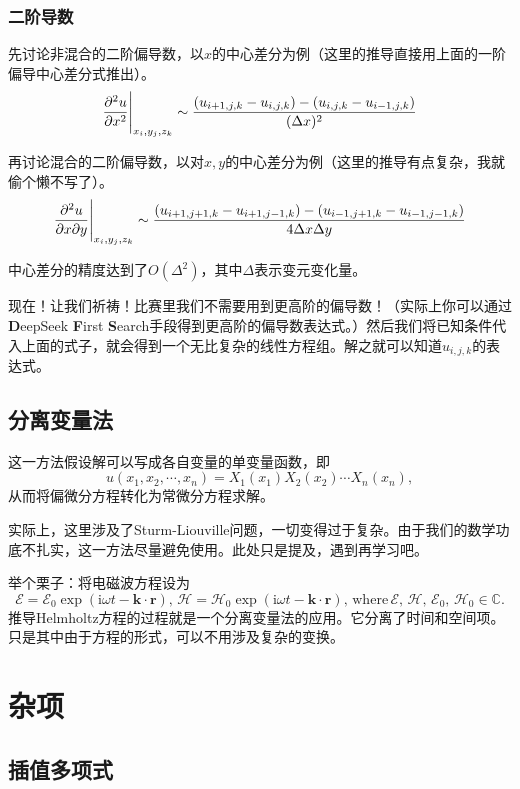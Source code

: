 \documentclass[a4paper, 12pt]{article}
\begin{document}
    \subsubsection{二阶导数}

    先讨论非混合的二阶偏导数，以$x$的中心差分为例（这里的推导直接用上面的一阶偏导中心差分式推出）。
    \[
    \frac{\partial^2 u}{\partial x^2}\Bigg{|}_{x_i,y_j,z_k}\sim\frac{(u_{i+1,j,k}-u_{i,j,k})-(u_{i,j,k}-u_{i-1,j,k})}{(\Delta x)^2}
    \]

    再讨论混合的二阶偏导数，以对$x,y$的中心差分为例（这里的推导有点复杂，我就偷个懒不写了）。
    \[
    \frac{\partial^2 u}{\partial x\partial y}\Bigg{|}_{x_i,y_j,z_k}\sim\frac{(u_{i+1,j+1,k}-u_{i+1,j-1,k})-(u_{i-1,j+1,k}-u_{i-1,j-1,k})}{4\Delta x\Delta y}
    \]

    中心差分的精度达到了$O(\Delta^2)$，其中$\Delta$表示变元变化量。

    现在！让我们祈祷！比赛里我们不需要用到更高阶的偏导数！（实际上你可以通过\textbf DeepSeek \textbf First \textbf Search手段得到更高阶的偏导数表达式。）然后我们将已知条件代入上面的式子，就会得到一个无比复杂的线性方程组。解之就可以知道$u_{i,j,k}$的表达式。

    \subsection{分离变量法}

    这一方法假设解可以写成各自变量的单变量函数，即
    \[
    u(x_1,x_2,\cdots,x_n)=X_1(x_1)X_2(x_2)\cdots X_n(x_n),
    \]
    从而将偏微分方程转化为常微分方程求解。

    实际上，这里涉及了Sturm-Liouville问题，一切变得过于复杂。由于我们的数学功底不扎实，这一方法尽量避免使用。此处只是提及，遇到再学习吧。

    举个栗子：将电磁波方程设为
    \[
    \mathcal E=\mathcal E_0\exp(\mathrm i\omega t-\boldsymbol k\cdot\boldsymbol r),\,\mathcal H=\mathcal H_0\exp(\mathrm i\omega t-\boldsymbol k\cdot\boldsymbol r),\,\mathrm{where}\,\mathcal E,\,\mathcal H,\,\mathcal E_0,\,\mathcal H_0\in\mathbb C.
    \]
    推导Helmholtz方程的过程就是一个分离变量法的应用。它分离了时间和空间项。只是其中由于方程的形式，可以不用涉及复杂的变换。

    \section{杂项}

    \subsection{插值多项式}
\end{document}
